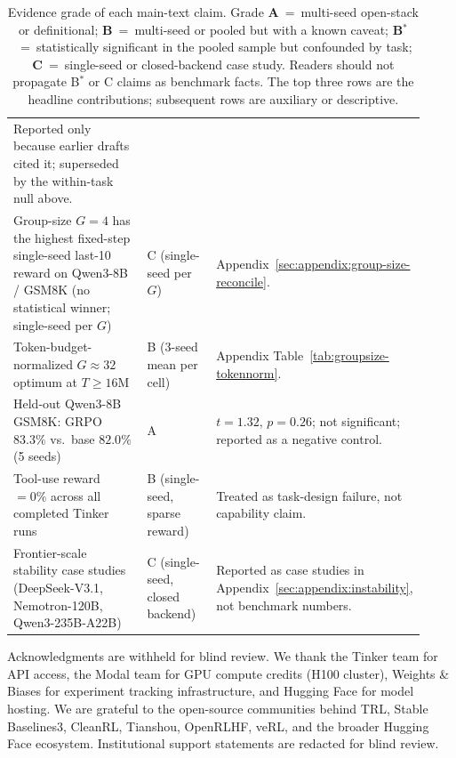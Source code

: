 \documentclass{article}
\begin{document}
\begin{table}[htbp]
\begin{tabular}{p{0.42\linewidth}p{0.18\linewidth}p{0.32\linewidth}}
Reported only because earlier drafts cited it; superseded by the
within-task null above. \\
Group-size $G{=}4$ has the highest fixed-step single-seed last-10 reward
on Qwen3-8B / GSM8K (no statistical winner; single-seed per $G$) &
C (single-seed per $G$) &
Appendix~\ref{sec:appendix:group-size-reconcile}. \\
Token-budget-normalized $G{\approx}32$ optimum at $T\!\ge\!16$M &
B (3-seed mean per cell) &
Appendix Table~\ref{tab:groupsize-tokennorm}. \\
Held-out Qwen3-8B GSM8K: GRPO $83.3\%$ vs.\ base $82.0\%$ (5 seeds) &
A &
$t{=}1.32$, $p{=}0.26$; not significant; reported as a negative control. \\
Tool-use reward $=0\%$ across all completed Tinker runs &
B (single-seed, sparse reward) &
Treated as task-design failure, not capability claim. \\
Frontier-scale stability case studies (DeepSeek-V3.1, Nemotron-120B,
Qwen3-235B-A22B) &
C (single-seed, closed backend) &
Reported as case studies in
Appendix~\ref{sec:appendix:instability}, not benchmark numbers. \\
\bottomrule
\end{tabular}
\caption{Evidence grade of each main-text claim. Grade
\textbf{A}~=~multi-seed open-stack or definitional; \textbf{B}~=~multi-seed
or pooled but with a known caveat; \textbf{B$^{*}$}~=~statistically
significant in the pooled sample but confounded by task; \textbf{C}~=~single-seed
or closed-backend case study. Readers should not propagate B$^{*}$ or C
claims as benchmark facts. The top three rows are the headline contributions;
subsequent rows are auxiliary or descriptive.}
\label{tab:evidence-grade}
\end{table}



\label{sec:acknowledgments}
\begin{ack}
Acknowledgments are withheld for blind review. We thank the Tinker team for
API access, the Modal team for GPU compute credits (H100 cluster), Weights
\& Biases for experiment tracking infrastructure, and Hugging Face for model
hosting. We are grateful to the open-source communities behind TRL, Stable
Baselines3, CleanRL, Tianshou, OpenRLHF, veRL, and the broader Hugging Face
ecosystem. Institutional support statements are redacted for blind review.
\end{ack}
\end{document}
